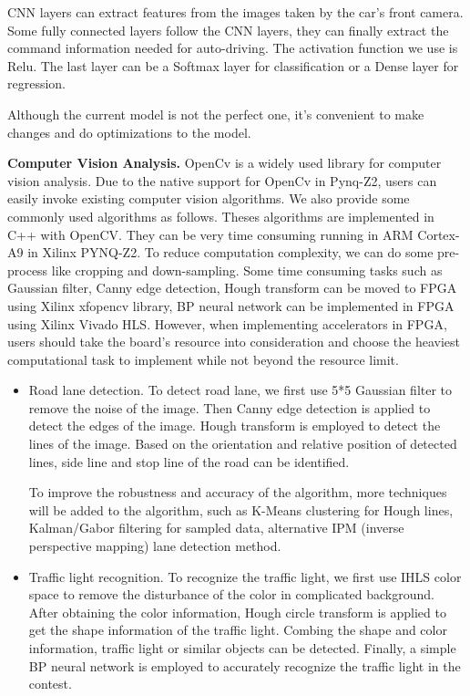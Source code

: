 \documentclass[conference]{IEEEtran}
\begin{document}
CNN layers can extract features from the images taken by the car's front camera. Some fully connected layers follow the CNN layers, they can finally extract the command information needed for auto-driving. The activation function we use is Relu. The last layer can be a Softmax layer\cite{b25} for classification or a Dense layer for regression.  

Although the current model is not the perfect one, it's convenient to make changes and do optimizations to the model.

\textbf{Computer Vision Analysis.} OpenCv\cite{b20} is a widely used library for computer vision analysis. Due to the native support for OpenCv in Pynq-Z2, users can easily invoke existing computer vision algorithms. We also provide some commonly used algorithms as follows. Theses algorithms are implemented in C++ with OpenCV. They can be very time consuming running in ARM Cortex-A9 in Xilinx PYNQ-Z2. To reduce computation complexity, we can do some pre-process like cropping and down-sampling. Some time consuming tasks such as Gaussian filter, Canny edge detection, Hough transform can be moved to FPGA using Xilinx xfopencv library\cite{b30}, BP neural network can be implemented in FPGA using Xilinx Vivado HLS. However, when implementing accelerators in FPGA, users should take the board's resource into consideration and choose the heaviest computational task to implement while not beyond the resource limit.

\begin{itemize}
\item{Road lane detection.} To detect road lane, we first use 5*5 Gaussian filter to remove the noise of the image. Then Canny edge detection\cite{b26} is applied to detect the edges of the image. Hough transform\cite{b27} is employed to detect the lines of the image. Based on the orientation and relative position of detected lines, side line and stop line of the road can be identified. 

To improve the robustness and accuracy of the algorithm, more techniques will be added to the algorithm, such as K-Means clustering\cite{b28} for Hough lines, Kalman/Gabor filtering for sampled data, alternative IPM (inverse perspective mapping) lane detection method\cite{b29}.

\item{Traffic light recognition.} To recognize the traffic light, we first use IHLS color space\cite{b31} to remove the disturbance of the color in complicated background. After obtaining the color information, Hough circle transform\cite{b32} is applied to get the shape information of the traffic light. Combing the shape and color information, traffic light or similar objects can be detected. Finally, a simple BP neural network is employed to accurately recognize the traffic light in the contest.

\end{itemize}
\end{document}
